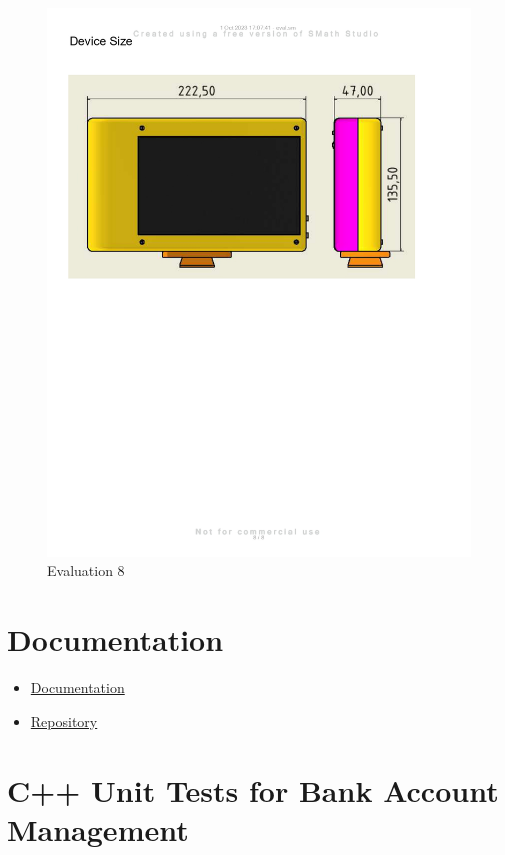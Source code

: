 \begin{figure}[H]
    \centering
    \includegraphics[width=\linewidth]{texs/appendix/data/evaluation/eval_page-0008.jpg}
    \caption{Evaluation 8}
    \label{fig:evaluation-8}
\end{figure}

\section{Documentation}
\label{appendix:documentation}

\begin{itemize}
    \item \href{https://haziqsabtu.github.io/SpeedCameraPi/}{Documentation}
    \item \href{https://github.com/HaziqSabtu/SpeedCameraPi}{Repository}
\end{itemize}

\section{C++ Unit Tests for Bank Account Management}
\label{appendix:unit-tests}

